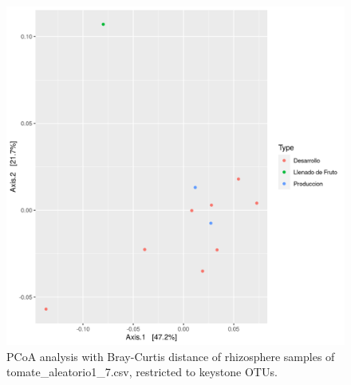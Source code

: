 \begin{figure}
  \centering
  \includegraphics[scale = 0.7]{pcoa_key_otus_tomate_aleatorio1_7.csv.png}
  \caption{PCoA analysis with Bray-Curtis distance of rhizosphere samples of tomate_aleatorio1_7.csv, restricted to keystone OTUs.}
  \label{fig:tomate_aleatorio1_7.csv_pcoa_key_otus}
\end{figure}

